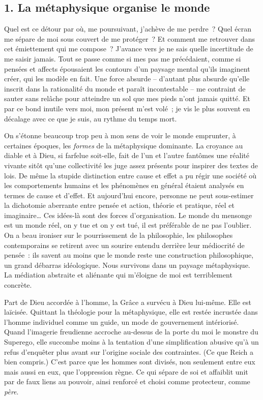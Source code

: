 \documentclass[french,twoside]{book} %
\begin{document}
\subsection[{1. La métaphysique organise le monde}]{\textsc{1.} La métaphysique organise le monde}
\noindent Quel est ce détour par où, me poursuivant, j’achève de me perdre ? Quel écran me sépare de moi sous couvert de me protéger ? Et comment me retrouver dans cet émiettement qui me compose ? J’avance vers je ne sais quelle incertitude de me saisir jamais. Tout se passe comme si mes pas me précédaient, comme si pensées et affects épousaient les contours d’un paysage mental qu’ils imaginent créer, qui les modèle en fait. Une force absurde – d’autant plus absurde qu’elle inscrit dans la rationalité du monde et paraît incontestable – me contraint de sauter sans relâche pour atteindre un sol que mes pieds n’ont jamais quitté. Et par ce bond inutile vers moi, mon présent m’est volé ; je vis le plus souvent en décalage avec ce que je suis, au rythme du temps mort.\par
On s’étonne beaucoup trop peu à mon sens de voir le monde emprunter, à certaines époques, les \emph{formes} de la métaphysique dominante. La croyance au diable et à Dieu, si farfelue soit-elle, fait de l’un et l’autre fantômes une réalité vivante sitôt qu’une collectivité les juge assez présents pour inspirer des textes de lois. De même la stupide distinction entre cause et effet a pu régir une société où les comportements humains et les phénomènes en général étaient analysés en termes de cause et d’effet. Et aujourd’hui encore, personne ne peut sous-estimer la dichotomie aberrante entre pensée et action, théorie et pratique, réel et imaginaire… Ces idées-là sont des forces d’organisation. Le monde du mensonge est un monde réel, on y tue et on y est tué, il est préférable de ne pas l’oublier. On a beau ironiser sur le pourrissement de la philosophie, les philosophes contemporains se retirent avec un sourire entendu derrière leur médiocrité de pensée : ils savent au moins que le monde reste une construction philosophique, un grand débarras idéologique. Nous survivons dans un paysage métaphysique. La médiation abstraite et aliénante qui m’éloigne de moi est terriblement concrète.\par
Part de Dieu accordée à l’homme, la Grâce a survécu à Dieu lui-même. Elle est laïcisée. Quittant la théologie pour la métaphysique, elle est restée incrustée dans l’homme individuel comme un guide, un mode de gouvernement intériorisé. Quand l’imagerie freudienne accroche au-dessus de la porte du moi le monstre du Superego, elle succombe moins à la tentation d’une simplification abusive qu’à un refus d’enquêter plus avant sur l’origine sociale des contraintes. (Ce que Reich a bien compris.) C’est parce que les hommes sont divisés, non seulement entre eux mais aussi en eux, que l’oppression règne. Ce qui sépare de soi et affaiblit unit par de faux liens au pouvoir, ainsi renforcé et choisi comme protecteur, comme \emph{père}.\par
\end{document}
